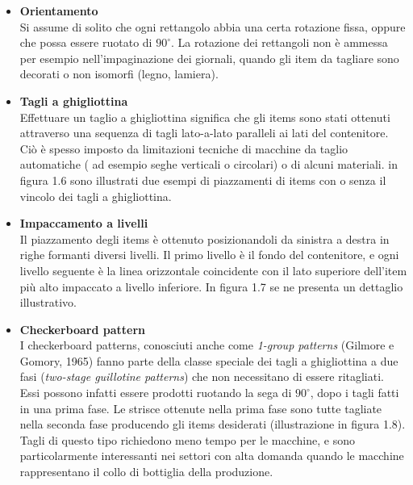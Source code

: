 \documentclass[12pt,a4paper,openright,twoside]{report}
\begin{document}
\begin{itemize}
\item \textbf{Orientamento}\\ Si assume di solito che ogni rettangolo abbia una certa rotazione fissa, oppure che possa essere ruotato di $90^{\circ}$. La rotazione dei rettangoli non \`{e} ammessa per esempio nell'impaginazione dei giornali, quando gli item da tagliare sono decorati o non isomorfi (legno, lamiera).

\item \textbf{Tagli a ghigliottina}\\ Effettuare un taglio a ghigliottina significa che gli items sono stati ottenuti attraverso una sequenza di tagli lato-a-lato paralleli ai lati del contenitore. Ci\`{o} \`{e} spesso imposto da limitazioni tecniche di macchine da taglio automatiche ( ad esempio seghe verticali o circolari) o di alcuni materiali. in figura 1.6 sono illustrati due esempi di piazzamenti di items con o senza il vincolo dei tagli a ghigliottina.
 
\item \textbf{Impaccamento a livelli}\\ Il piazzamento degli items \`{e} ottenuto posizionandoli da sinistra a destra in righe formanti diversi livelli. Il primo livello \`{e} il fondo del contenitore, e ogni livello seguente \`{e} la linea orizzontale coincidente con il lato superiore dell'item pi\`{u} alto impaccato a livello inferiore. In figura 1.7 se ne presenta un dettaglio illustrativo.

\item \textbf{Checkerboard pattern}\\ I checkerboard patterns, conosciuti anche come \textit{1-group patterns} (Gilmore e Gomory, 1965) fanno parte della classe speciale dei tagli a ghigliottina a due fasi (\textit{two-stage guillotine patterns}) che non necessitano di essere ritagliati. Essi
possono infatti essere prodotti ruotando la sega di $90^{\circ}$, dopo i tagli fatti in una prima fase. Le strisce ottenute nella prima fase sono tutte tagliate nella seconda fase producendo gli items desiderati (illustrazione in figura 1.8). Tagli di questo tipo richiedono meno tempo per le macchine, e sono particolarmente interessanti nei settori con alta domanda quando le macchine rappresentano il collo di bottiglia della produzione.


\end{itemize}
\end{document}
